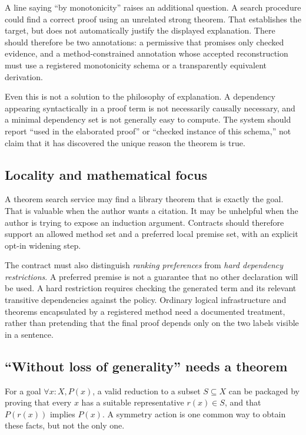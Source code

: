 \documentclass[11pt,a4paper]{article}
\newcommand{\code}[1]{\texttt{\detokenize{#1}}}
\theoremstyle{remark}
\begin{document}
A line saying ``by monotonicity'' raises an additional question. A search procedure could find a correct proof using an unrelated strong theorem. That establishes the target, but does not automatically justify the displayed explanation. There should therefore be two annotations: a permissive \code{by auto} that promises only checked evidence, and a method-constrained annotation whose accepted reconstruction must use a registered monotonicity schema or a transparently equivalent derivation.

Even this is not a solution to the philosophy of explanation. A dependency appearing syntactically in a proof term is not necessarily causally necessary, and a minimal dependency set is not generally easy to compute. The system should report ``used in the elaborated proof'' or ``checked instance of this schema,'' not claim that it has discovered the unique reason the theorem is true.

\subsection{Locality and mathematical focus}

A theorem search service may find a library theorem that is exactly the goal. That is valuable when the author wants a citation. It may be unhelpful when the author is trying to expose an induction argument. Contracts should therefore support an allowed method set and a preferred local premise set, with an explicit opt-in widening step.

The contract must also distinguish \emph{ranking preferences} from \emph{hard dependency restrictions}. A preferred premise is not a guarantee that no other declaration will be used. A hard restriction requires checking the generated term and its relevant transitive dependencies against the policy. Ordinary logical infrastructure and theorems encapsulated by a registered method need a documented treatment, rather than pretending that the final proof depends only on the two labels visible in a sentence.

\subsection{``Without loss of generality'' needs a theorem}

For a goal \(\forall x:X,P(x)\), a valid reduction to a subset \(S\subseteq X\) can be packaged by proving that every \(x\) has a suitable representative \(r(x)\in S\), and that \(P(r(x))\) implies \(P(x)\). A symmetry action is one common way to obtain these facts, but not the only one.
\end{document}
